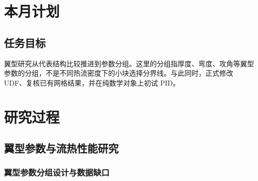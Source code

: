 \documentclass[stage2,fontset=fandol]{ydzjreport}
\begin{document}
\makestagetwohead

\section{本月计划}

\subsection{任务目标}

翼型研究从代表结构比较推进到参数分组。这里的分组指厚度、弯度、攻角等翼型参数的分组，不是不同热流密度下的小块选择分界线。与此同时，正式修改 UDF、复核已有网格结果，并在纯数学对象上初试 PID。

\section{研究过程}

\subsection{翼型参数与流热性能研究}

\subsubsection{翼型参数分组设计与数据缺口}
\end{document}
